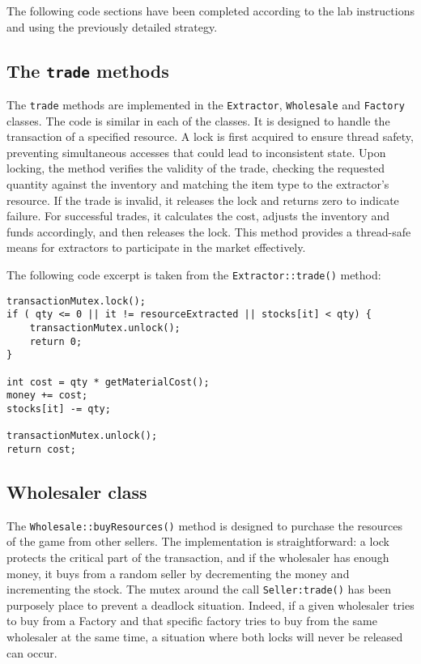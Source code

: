 \documentclass{article}
\begin{document}
    The following code sections have been completed according to the lab instructions and using the previously detailed
    strategy.

    \subsection{The \texttt{trade} methods}

    The \texttt{trade} methods are implemented in the \texttt{Extractor}, \texttt{Wholesale} and \texttt{Factory} classes.
    The code is similar in each of the classes. It is designed to handle the transaction of a specified resource.
    A lock is first acquired to ensure thread safety, preventing simultaneous accesses that could lead to inconsistent
    state.
    Upon locking, the method verifies the validity of the trade, checking the requested quantity against the inventory and
    matching the item type to the extractor's resource.
    If the trade is invalid, it releases the lock and returns zero to indicate failure. For successful trades, it calculates
    the cost, adjusts the inventory and funds accordingly, and then releases the lock. This method provides a thread-safe
    means for extractors to participate in the market effectively.

    The following code excerpt is taken from the \texttt{Extractor::trade()} method:

    \begin{lstlisting}
transactionMutex.lock();
if ( qty <= 0 || it != resourceExtracted || stocks[it] < qty) {
    transactionMutex.unlock();
    return 0;
}

int cost = qty * getMaterialCost();
money += cost;
stocks[it] -= qty;

transactionMutex.unlock();
return cost;
    \end{lstlisting}

    \subsection{Wholesaler class}

    The \texttt{Wholesale::buyResources()} method is designed to purchase the resources of the game from other sellers.
    The implementation is straightforward: a lock protects the critical part of the transaction, and if the wholesaler
    has enough money, it buys from a random seller by decrementing the money and incrementing the stock.
    The mutex around the call \texttt{Seller:trade()} has been purposely place to prevent a deadlock situation. Indeed, if a given
    wholesaler tries to buy from a Factory and that specific factory tries to buy from the same wholesaler at the same time, a
    situation where both locks will never be released can occur.
\end{document}
